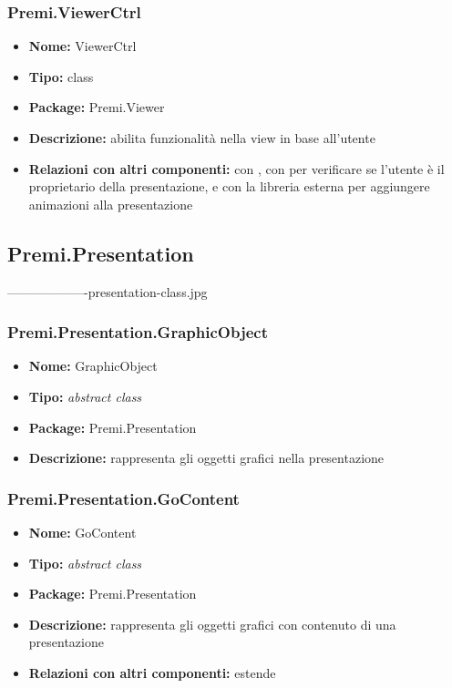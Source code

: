 \subsubsection{Premi.ViewerCtrl}
\begin{itemize}
  \item \textbf{Nome:} ViewerCtrl
  \item \textbf{Tipo:} class
  \item \textbf{Package:} Premi.Viewer
  \item \textbf{Descrizione:} abilita funzionalità nella view in base all'utente
  \item \textbf{Relazioni con altri componenti:} con , con  per verificare se l'utente è il proprietario della presentazione, e con la libreria esterna  per aggiungere animazioni alla presentazione
\end{itemize}
\subsection{Premi.Presentation}
-------------------presentation-class.jpg
\subsubsection{Premi.Presentation.GraphicObject}
\begin{itemize}
  \item \textbf{Nome:} GraphicObject
  \item \textbf{Tipo:} \textit{abstract class}
  \item \textbf{Package:} Premi.Presentation
  \item \textbf{Descrizione:} rappresenta gli oggetti grafici nella presentazione
\end{itemize}
\subsubsection{Premi.Presentation.GoContent}
\begin{itemize}
  \item \textbf{Nome:} GoContent
  \item \textbf{Tipo:} \textit{abstract class}
  \item \textbf{Package:} Premi.Presentation
  \item \textbf{Descrizione:} rappresenta gli oggetti grafici con contenuto di una presentazione
  \item \textbf{Relazioni con altri componenti:} estende 
\end{itemize}
